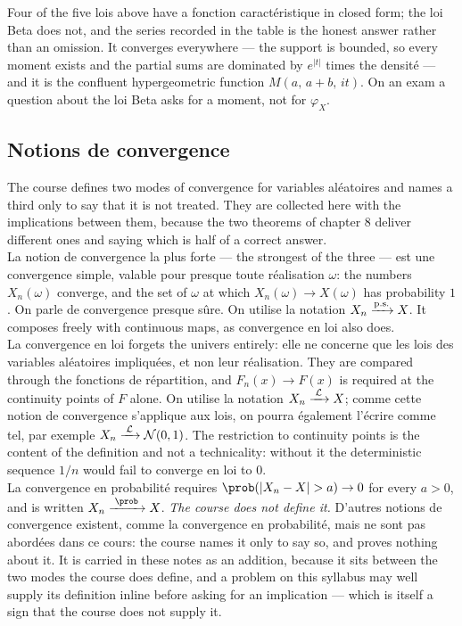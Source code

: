 \begin{remark}
  Four of the five lois above have a fonction caractéristique in closed form; the
  loi Beta does not, and the series recorded in the table is the honest answer
  rather than an omission. It converges everywhere --- the support is
  bounded, so every moment exists and the partial sums are dominated by $e^{|t|}$
  times the densité --- and it is the confluent hypergeometric function
  $M(a,\,a+b,\,it)$. On an exam a question about the loi Beta asks for a
  moment, not for $\varphi_{X}$.
\end{remark}

\subsection{Notions de convergence}
The course defines two modes of convergence for variables aléatoires and names a
third only to say that it is not treated. They are collected here with the
implications between them, because the two theorems of chapter 8 deliver different
ones and saying which is half of a correct answer.\\
La notion de convergence la plus forte --- the strongest of the three --- est une
convergence simple, valable pour presque toute réalisation $\omega$: the numbers
$X_{n}(\omega)$ converge, and the set of $\omega$ at which
$X_{n}(\omega) \to X(\omega)$ has probability $1$. On parle de convergence
presque sûre. On utilise la notation
$X_{n} \xrightarrow{\text{p.s.}} X$. It composes freely with continuous maps, as convergence en loi also does.\\
La convergence en loi forgets the univers entirely: elle ne concerne que les lois
des variables aléatoires impliquées, et non leur réalisation. They are compared
through the fonctions de répartition, and
$F_{n}(x) \to F(x)$ is required at the continuity points of $F$ alone. On utilise
la notation $X_{n} \xrightarrow{\;\mathcal{L}\;} X$; comme cette notion de convergence s'applique aux lois,
on pourra également l'écrire comme tel, par exemple
$X_{n} \xrightarrow{\;\mathcal{L}\;} \mathcal{N}(0,1)$. The restriction to continuity
points is the content of the definition and not a technicality: without
it the deterministic sequence $1/n$ would fail to converge en loi to $0$.\\
La convergence en probabilité requires $\prob(|X_{n} - X| > a) \to 0$ for every
$a > 0$, and is written $X_{n} \cvP X$.
\emph{The course does not define it.} D'autres notions de convergence existent,
comme la convergence en probabilité, mais ne sont pas abordées dans ce cours: the
course names it only to say so, and proves nothing about it. It
is carried in these notes as an addition, because it sits between the two modes the
course does define, and a problem on this syllabus may well supply its definition
inline before asking for an implication --- which is itself a sign that the course
does not supply it.

